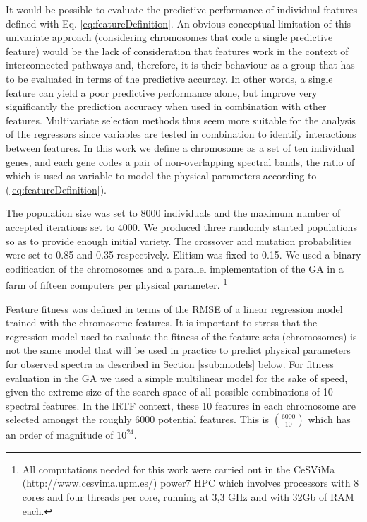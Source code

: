 It would be possible to evaluate the predictive performance of
individual features defined with Eq. \ref{eq:featureDefinition}. An obvious
conceptual limitation of this univariate approach (considering
chromosomes that code a single predictive feature) would be the lack
of consideration that features work in the context of interconnected
pathways and, therefore, it is their behaviour as a group that has to
be evaluated in terms of the predictive accuracy. In other words, a
single feature can yield a poor predictive performance alone, but
improve very significantly the prediction accuracy when used in
combination with other features. Multivariate selection methods thus
seem more suitable for the analysis of the regressors since variables
are tested in combination to identify interactions between
features. In this work we define a chromosome as a set of ten
individual genes, and each gene codes a pair of non-overlapping
spectral bands, the ratio of which is used as 
variable to model the 
physical parameters according to (\ref{eq:featureDefinition}).

The population size was set to 8000 individuals and the maximum number
of accepted iterations set to 4000. We produced three randomly started
populations so as to provide enough initial variety. The crossover and
mutation probabilities were set to 0.85 and 0.35 respectively. Elitism
was fixed to 0.15. We used a binary codification of the chromosomes
and a parallel implementation of the GA in a farm of fifteen computers
per physical parameter. \footnote{All computations needed for this work
were carried out in the CeSViMa (http://www.cesvima.upm.es/) power7
HPC which involves processors with 8 cores and four threads per core,
running at 3,3 GHz and with 32Gb of RAM each.}

Feature fitness was defined in terms of the RMSE of a linear
regression model trained with the chromosome features. It is important
to stress that the regression model used to evaluate the fitness of
the feature sets (chromosomes) is not the same model that will be used
in practice to predict physical parameters for observed spectra as
described in Section \ref{ssub:models} below. For fitness evaluation
in the GA we used a simple multilinear model for the sake of speed,
given the extreme size of the search space of all possible
combinations of 10 spectral features. In the IRTF context, these 10
features in each chromosome are selected amongst the roughly 6000
potential features. This is $\binom{6000}{10}$ which has an order of
magnitude of $10^{24}$.

